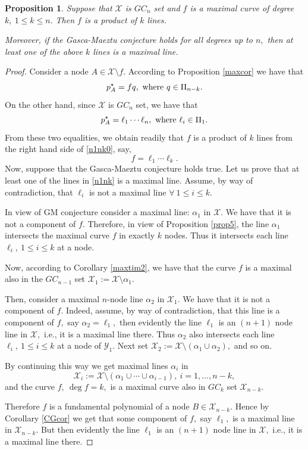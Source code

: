 \documentclass[a4paper,12pt]{article}
\newtheorem{proposition}[lemma]{Proposition}
\theoremstyle{definition}
\numberwithin{equation}{section}
\numberwithin{figure}{section}
\newcommand{\Xset}{\mathcal{X}}
\newcommand{\Yset}{\mathcal{Y}}
\begin{document}
\begin{proposition} \label{nor} Suppose that $\Xset$ is $GC_n$ set and $f$ is a maximal curve of degree $k,\ 1\le k\le n.$ Then $f$ is a product of $k$ lines. 

Moreover, if the Gasca-Maeztu conjecture  holds for all degrees up to $n,$ then at least one of the above $k$ lines is a maximal line.
\end{proposition}
\begin{proof} Consider a node $A\in\Xset\setminus f.$ According to Proposition \ref{maxcor} we have that
$$p^\star_A=f q, \ \hbox{where}\ q\in \Pi_{n-k}.$$
On the other hand, since $\Xset$ is $GC_n$ set, we have that
\begin{equation}\label{n1nk0}p^\star_A=\ell_1\cdots\ell_n, \ \hbox{where}\ \ell_i\in \Pi_1.\end{equation}
From these two equalities, we obtain readily that $f$ is a product of $k$ lines from the right hand side of \eqref{n1nk0}, say,
\begin{equation}\label{n1nk}f=\ell_{1}\cdots\ell_{k}.  
\end{equation}
Now, suppose that the Gasca-Maeztu conjecture  holds true. Let us prove that at least one of the lines in \eqref{n1nk} is a maximal line.
Assume, by way of contradiction, that $\ell_{i}$ is not a maximal line  $\forall \ 1\le i\le k.$

In view of GM conjecture consider a maximal line: $\alpha_1$ in $\Xset.$ We have that it is not a component of $f.$
Therefore, in view of Proposition \ref{prop5}, the line $\alpha_1$ intersects the maximal curve $f$ in exactly $k$ nodes. Thus it intersects each line $\ell_{i},\ 1\le i\le k$ at a node.

Now, according to Corollary \ref{maxtim2}, we have that the curve $f$ is a maximal also in the $GC_{n-1}$ set $\Xset_{1}:=\Xset\setminus \alpha_1.$ 

Then, consider a maximal $n$-node line $\alpha_2$ in $\Xset_{1}.$ We have that it is not a component of $f.$ Indeed, assume, by way of contradiction, that this line is a component of $f,$ say $\alpha_2=\ell_1,$ then evidently the line $\ell_{1}$ is an $(n+1)$ node line in $\Xset,$ i.e., it is a maximal line there.  Thus $\alpha_2$ also intersects each line $\ell_{i},\ 1\le i\le k$ at a node of $\Yset_{1}.$  Next set $\Xset_{2}:=\Xset\setminus (\alpha_1\cup \alpha_2),$ and so on.

By continuing this way we get maximal lines $\alpha_i$ in 
$$\Xset_{i}:=\Xset\setminus (\alpha_1\cup\cdots\cup \alpha_{i-1}),\ i=1,\ldots, n-k,$$ and the curve $f,\ \deg f=k,$ is a maximal curve also in $GC_k$ 
set $\Xset_{n-k}.$

Therefore $f$ is a fundamental polynomial of a node  $B\in\Xset_{n-k}.$ Hence by Corollary \ref{CGcor} we get that some component of $f,$ say $\ell_{1},$ is a maximal line in $\Xset_{n-k}.$ But then evidently the line $\ell_{1}$ is an $(n+1)$ node line in $\Xset,$ i.e., it is a maximal line there. 
\end{proof}
\end{document}
